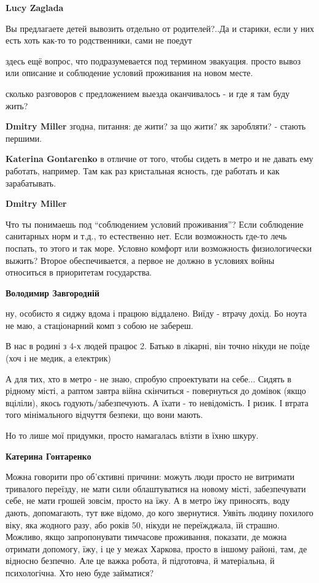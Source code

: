 \begin{itemize}
\textbf{Lucy Zaglada} 

Вы предлагаете детей вывозить отдельно от родителей?..Да и старики, если у них
есть хоть как-то то родственники, сами не поедут


здесь ещё вопрос, что подразумевается под термином эвакуация. просто вывоз или
описание и соблюдение условий проживания на новом месте.

сколько разговоров с предложением выезда оканчивалось - и где я там буду жить?

\begin{itemize} %
\textbf{Dmitry Miller} згодна, питання: де жити? за що жити? як заробляти? - стають першими.

\textbf{Katerina Gontarenko} в отличие от того, чтобы сидеть в метро и не давать ему работать, например.
Там как раз кристальная ясность, где работать и как зарабатывать.

\textbf{Dmitry Miller} 

Что ты понимаешь под \enquote{соблюдением условий проживания}? Если соблюдение
санитарных норм и т.д., то естественно нет. Если возможность где-то лечь
поспать, то этого и так море. Условно комфорт или возможность физиологически
выжить? Второе обеспечивается, а первое не должно в условиях войны относиться в
приоритетам государства.

\textbf{Володимир Завгородній} 

ну, особисто я сиджу вдома і працюю віддалено. Виїду - втрачу дохід. Бо ноута
не маю, а стаціонарний комп з собою не забереш.

В нас в родині з 4-х людей працює 2. Батько в лікарні, він точно нікуди не поїде (хоч і не медик, а електрик)

А для тих, хто в метро - не знаю, спробую спроектувати на себе... Сидять в
рідному місті, а раптом завтра війна скінчиться - повернуться до домівок (якщо
вціліли), якось годують/забезпечують. А їхати - то невідомість. І ризик. І
втрата того мінімального відчуття безпеки, що вони мають.

Но то лише мої придумки, просто намагалась влізти в їхню шкуру.

\textbf{Катерина Гонтаренко} 

Можна говорити про об'єктивні причини: можуть люди просто не витримати
тривалого переїзду, не мати сили облаштуватися на новому місті, забезпечувати
себе, не мати грошей зовсім, просто на їжу. А в метро їжу приносять, воду
дають, допомагають, тут вже відомо, до кого звернутися. Уявіть людину похилого
віку, яка жодного разу, або років 50, нікуди не переїжджала, їй страшно.
Можливо, якщо запропонувати тимчасове проживання, показати, де можна отримати
допомогу, їжу, і це у межах Харкова, просто в іншому районі, там, де відносно
безпечно. Але це важка робота, й підготовча, й матеріальна, й психологічна. Хто
нею буде займатися?


\end{itemize}
\end{itemize}
